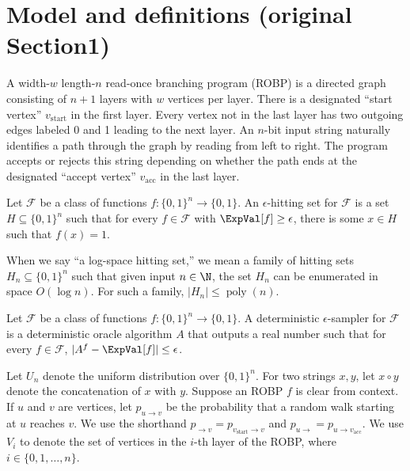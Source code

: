\setcounter{section}{1}
\section*{Model and definitions (original Section1)}
A width-$w$ length-$n$ read-once branching program (ROBP) is a directed graph consisting of $n+1$ layers with $w$ vertices per layer. There is a designated ``start vertex'' $v_{\text{start}}$ in the first layer. Every vertex not in the last layer has two outgoing edges labeled 0 and 1 leading to the next layer. An $n$-bit input string naturally identifies a path through the graph by reading from left to right. The program accepts or rejects this string depending on whether the path ends at the designated ``accept vertex'' $v_{\text{acc}}$ in the last layer.
\setcounter{theorem}{1}
\begin{definition}
Let $\mathcal F$ be a class of functions $f:\{0,1\}^n\to\{0,1\}$. An $\epsilon$-hitting set for $\mathcal F$ is a set $H\subseteq\{0,1\}^n$ such that for every $f\in\mathcal F$ with $\ExpVal[f]\ge\epsilon$, there is some $x\in H$ such that $f(x)=1$.
\end{definition}
When we say ``a log-space hitting set,'' we mean a family of hitting sets $H_n\subseteq\{0,1\}^n$ such that given input $n\in\N$, the set $H_n$ can be enumerated in space $O(\log n)$. For such a family, $|H_n|\le\operatorname{poly}(n)$.
\setcounter{theorem}{4}
\begin{definition}
Let $\mathcal F$ be a class of functions $f:\{0,1\}^n\to\{0,1\}$. A deterministic $\epsilon$-sampler for $\mathcal F$ is a deterministic oracle algorithm $A$ that outputs a real number such that for every $f\in\mathcal F$, $|A^f-\ExpVal[f]|\le\epsilon$.
\end{definition}
Let $U_n$ denote the uniform distribution over $\{0,1\}^n$. For two strings $x,y$, let $x\circ y$ denote the concatenation of $x$ with $y$. Suppose an ROBP $f$ is clear from context. If $u$ and $v$ are vertices, let $p_{u\to v}$ be the probability that a random walk starting at $u$ reaches $v$. We use the shorthand $p_{\to v}=p_{v_{\text{start}}\to v}$ and $p_{u\to}=p_{u\to v_{\text{acc}}}$. We use $V_i$ to denote the set of vertices in the $i$-th layer of the ROBP, where $i\in\{0,1,\ldots,n\}$.
